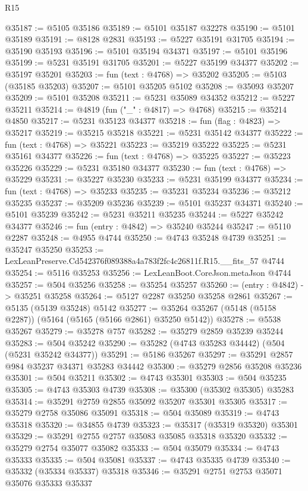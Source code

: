 \begin{lexlean}{R15}
\begin{coremodule}
{{{{{{{{{{{@35187 := @5105 @35186
@35189 := @5101 @35187 @32278
@35190 := @5101 @35189
@35191 := @8128 @2831
@35193 := @5227 @35191 @31705
@35194 := @35190 @35193
@35196 := @5101 @35194 @34371
@35197 := @5101 @35196
@35199 := @5231 @35191 @31705
@35201 := @5227 @35199 @34377
@35202 := @35197 @35201
@35203 := fun (text : @4768) => @35202
@35205 := @5103 (@35185 @35203)
@35207 := @5101 @35205 @5102
@35208 := @35093 @35207
@35209 := @5101 @35208
@35211 := @5231 @35089 @34352
@35212 := @5227 @35211
@35214 := @4819 (fun ("_" : @4817) => @4768)
@35215 := @35214 @4850
@35217 := @5231 @35123 @34377
@35218 := fun (flag : @4823) => @35217
@35219 := @35215 @35218
@35221 := @5231 @35142 @34377
@35222 := fun (text : @4768) => @35221
@35223 := @35219 @35222
@35225 := @5231 @35161 @34377
@35226 := fun (text : @4768) => @35225
@35227 := @35223 @35226
@35229 := @5231 @35180 @34377
@35230 := fun (text : @4768) => @35229
@35231 := @35227 @35230
@35233 := @5231 @35199 @34377
@35234 := fun (text : @4768) => @35233
@35235 := @35231 @35234
@35236 := @35212 @35235
@35237 := @35209 @35236
@35239 := @5101 @35237 @34371
@35240 := @5101 @35239
@35242 := @5231 @35211 @35235
@35244 := @5227 @35242 @34377
@35246 := fun (entry : @4842) => @35240 @35244
@35247 := @5110 @2287
@35248 := @4955 @4744
@35250 := @4743 @35248 @4739
@35251 := @35247 @35250
@35253 := LexLeanPreserve.Cd542376f089388a4a783f2fc4c26811f.R15.__fits_57 @4744
@35254 := @5116 @35253
@35256 := LexLeanBoot.CoreJson.metaJson @4744
@35257 := @504 @35256
@35258 := @35254 @35257
@35260 := (entry : @4842) -> @35251 @35258
@35264 := @5127 @2287 @35250 @35258 @2861
@35267 := @5135 (@5139 @35248) @5142
@35277 := @35264 @35267 (@5148 (@5158 @2287)) (@5164 (@5165 (@5166 @2861) @35250 @5142))
@35278 := @5538 @35267
@35279 := @35278 @757
@35282 := @35279 @2859 @35239 @35244
@35283 := @504 @35242
@35290 := @35282 (@4743 @35283 @34442) (@504 (@5231 @35242 @34377))
@35291 := @5186 @35267
@35297 := @35291 @2857 @984 @35237 @34371 @35283 @34442
@35300 := @35279 @2856 @35208 @35236
@35301 := @504 @35211
@35302 := @4743 @35301
@35303 := @504 @35235
@35305 := @4743 @35303 @4739
@35308 := @35300 (@35302 @35305) @35283
@35314 := @35291 @2759 @2855 @35092 @35207 @35301 @35305
@35317 := @35279 @2758 @35086 @35091
@35318 := @504 @35089
@35319 := @4743 @35318
@35320 := @34855 @4739
@35323 := @35317 (@35319 @35320) @35301
@35329 := @35291 @2755 @2757 @35083 @35085 @35318 @35320
@35332 := @35279 @2754 @35077 @35082
@35333 := @504 @35079
@35334 := @4743 @35333
@35335 := @504 @35081
@35337 := @4743 @35335 @4739
@35340 := @35332 (@35334 @35337) @35318
@35346 := @35291 @2751 @2753 @35071 @35076 @35333 @35337
}}}}}}}}}}}
\end{coremodule}
\end{lexlean}
